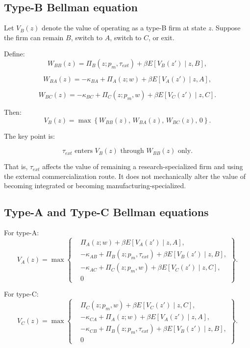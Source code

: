 \documentclass[12pt]{ctexart}
\begin{document}
\subsection{Type-B Bellman equation}

Let \(V_B(z)\) denote the value of operating as a type-B firm at state \(z\).
Suppose the firm can remain \(B\), switch to \(A\), switch to \(C\), or exit.

Define:
\[
W_{BB}(z)
=
\Pi_B(z;p_m,\tau_{ext})
+
\beta E\left[V_B(z')\mid z,B\right],
\]

\[
W_{BA}(z)
=
-\kappa_{BA}
+
\Pi_A(z;w)
+
\beta E\left[V_A(z')\mid z,A\right],
\]

\[
W_{BC}(z)
=
-\kappa_{BC}
+
\Pi_C(z;p_m,w)
+
\beta E\left[V_C(z')\mid z,C\right].
\]

Then:
\[
V_B(z)
=
\max\left\{
W_{BB}(z),\,
W_{BA}(z),\,
W_{BC}(z),\,
0
\right\}.
\]

The key point is:

\[
\tau_{ext} \text{ enters } V_B(z) \text{ through } W_{BB}(z) \text{ only.}
\]

That is, \(\tau_{ext}\) affects the value of remaining a research-specialized firm and using
the external commercialization route. It does not mechanically alter the value of becoming
integrated or becoming manufacturing-specialized.

\subsection{Type-A and Type-C Bellman equations}

For type-A:
\[
V_A(z)
=
\max\left\{
\begin{aligned}
&\Pi_A(z;w)+\beta E[V_A(z')\mid z,A],\\
&-\kappa_{AB}+\Pi_B(z;p_m,\tau_{ext})+\beta E[V_B(z')\mid z,B],\\
&-\kappa_{AC}+\Pi_C(z;p_m,w)+\beta E[V_C(z')\mid z,C],\\
&0
\end{aligned}
\right\}.
\]

For type-C:
\[
V_C(z)
=
\max\left\{
\begin{aligned}
&\Pi_C(z;p_m,w)+\beta E[V_C(z')\mid z,C],\\
&-\kappa_{CA}+\Pi_A(z;w)+\beta E[V_A(z')\mid z,A],\\
&-\kappa_{CB}+\Pi_B(z;p_m,\tau_{ext})+\beta E[V_B(z')\mid z,B],\\
&0
\end{aligned}
\right\}.
\]
\end{document}
